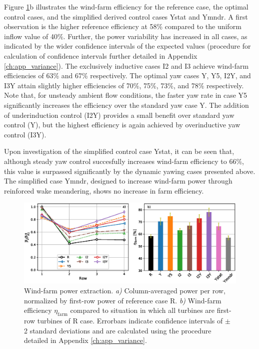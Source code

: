 	Figure \ref{fig:power_turb}b illustrates the wind-farm efficiency for the reference case, the optimal control cases, and the simplified derived control cases Ystat and Ymndr. A first observation is the higher reference efficiency at 58\% compared to the uniform inflow value of 40\%. Further, the power variability has increased in all cases, as indicated by the wider confidence intervals of the expected values (procedure for calculation of confidence intervals further detailed in Appendix \ref{ch:app_variance}). The exclusively inductive cases I2 and I3 achieve wind-farm efficiencies of 63\% and 67\% respectively. The optimal yaw cases Y, Y5, I2Y, and I3Y attain slightly higher efficiencies of 70\%, 75\%, 73\%, and 78\% respectively. Note that, for unsteady ambient flow conditions, the faster yaw rate in case Y5 significantly increases the efficiency over the standard yaw case Y. The addition of underinduction control (I2Y) provides a small benefit over standard yaw control (Y), but the highest efficiency is again achieved by overinductive yaw control (I3Y). 
	
	Upon investigation of the simplified control case Ystat, it can be seen that, although steady yaw control succesfully increases wind-farm efficiency to 66\%, this value is surpassed significantly by the dynamic yawing cases presented above. 
	The simplified case Ymndr, designed to increase wind-farm power through reinforced wake meandering, shows no increase in farm efficiency. 
	
	\begin{figure}
		\includegraphics[width=\textwidth]{chapters/optimal_yaw_control/power_row_turb_eff.eps}
		\caption{Wind-farm power extraction. \emph{a) } Column-averaged power per row, normalized by first-row power of reference case R. \emph{b) } Wind-farm efficiency $\eta_{\text{farm}}$ compared to situation in which all turbines are first-row turbines of R case. Errorbars indicate confidence intervals of $\pm$ 2 standard deviations and are calculated using the procedure detailed in Appendix \ref{ch:app_variance}. \label{fig:power_turb}}
	\end{figure}

